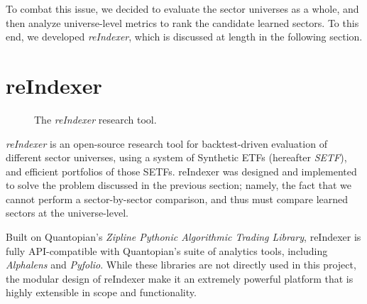 \documentclass[../main.tex]{subfiles}
\begin{document}
To combat this issue, we decided to evaluate the sector universes as a whole, and then analyze universe-level metrics to rank the candidate learned sectors. To this end, we developed \textit{reIndexer}, which is discussed at length in the following section.

\section{reIndexer}

\begin{figure}
    \centering
    \vspace{\wrapfigadjustment}
    \caption{The \textit{reIndexer} research tool.}
    \label{fig:candidate_universe_ranking:reindexer_logo}
\end{figure}

\textit{reIndexer} is an open-source research tool for backtest-driven evaluation of different sector universes, using a system of Synthetic ETFs (hereafter \textit{SETF}), and efficient portfolios of those SETFs. reIndexer was designed and implemented to solve the problem discussed in the previous section; namely, the fact that we cannot perform a sector-by-sector comparison, and thus must compare learned sectors at the universe-level.

Built on Quantopian's \textit{Zipline Pythonic Algorithmic Trading Library}, reIndexer is fully API-compatible with Quantopian's suite of analytics tools, including \textit{Alphalens} and \textit{Pyfolio}. While these libraries are not directly used in this project, the modular design of reIndexer make it an extremely powerful platform that is highly extensible in scope and functionality.
\end{document}
